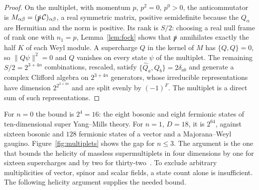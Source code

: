 \begin{proof}
On the multiplet, with momentum $p$, $p^2=0$, $p^0>0$, the anticommutator is $M_{\alpha\beta}=(\slashed{p}\,\mathcal C)_{\alpha\beta}$, a real symmetric matrix, positive semidefinite because the $Q_\alpha$ are Hermitian and the norm is positive. Its rank is $S/2$: choosing a real null frame of rank one with $n_1=p$, Lemma~\ref{lem:fock} shows that $\slashed p$ annihilates exactly the half $K$ of each Weyl module. A supercharge $Q$ in the kernel of $M$ has $\{Q,Q\}=0$, so $\|Q\psi\|^2=0$ and $Q$ vanishes on every state $\psi$ of the multiplet. The remaining $S/2=2^{3+4n}$ combinations, rescaled, satisfy $\{\hat Q_a,\hat Q_b\}=2\delta_{ab}$ and generate a complex Clifford algebra on $2^{3+4n}$ generators, whose irreducible representations have dimension $2^{2^{2+4n}}$ and are split evenly by $(-1)^F$. The multiplet is a direct sum of such representations.
\end{proof}

For $n=0$ the bound is $2^4=16$: the eight bosonic and eight fermionic states of ten-dimensional super Yang--Mills theory. For $n=1$, $D=18$, it is $2^{64}$, against sixteen bosonic and $128$ fermionic states of a vector and a Majorana--Weyl gaugino. Figure~\ref{fig:multiplets} shows the gap for $n\le3$. The argument is the one that bounds the helicity of massless supermultiplets in four dimensions by one for sixteen supercharges and by two for thirty-two~\cite{Nahm1978,Strathdee1987}. To exclude arbitrary multiplicities of vector, spinor and scalar fields, a state count alone is insufficient. The following helicity argument supplies the needed bound.

